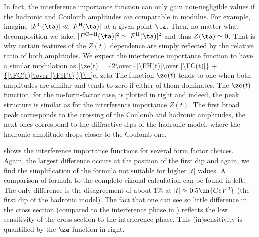 In fact, the interference importance function can only gain non-negligible values if the hadronic and Coulomb amplitudes are comparable in modulus. For example, imagine $|\FC(\ta)| \ll |\FH(\ta)|$ at a given point $\ta$. Then, no matter what decomposition  we take, $|\FCH(\ta)|^2 \simeq |\FH(\ta)|^2$ and thus $Z(\ta) \simeq 0$. That is why certain features of the $Z(t)$ dependence are simply reflected by the relative ratio of both amplitudes. We expect the interference importance function to have a similar modulation as 
\eqref{\ze(t) = {2\over {|\FH(t)|\over |\FC(t)|} + {|\FC(t)|\over |\FH(t)|}}\ .}{el zeta}
The function $\ze(t)$ tends to one when both amplitudes are similar and tends to zero if either of them dominates. The $\ze(t)$ function, for the no-form-factor case, is plotted in  right and indeed, the peak structure is similar as for the interference importance $Z(t)$. The first broad peak corresponds to the crossing of the Coulomb and hadronic amplitudes, the next ones correspond to the diffractive dips of the hadronic model, where the hadronic amplitude drops closer to the Coulomb one.

 shows the interference importance functions for several form factor choices. Again, the largest difference occurs at the position of the first dip and again, we find the simplification of the \WaY{} formula not suitable for higher $|t|$ values. A comparison of \KL{} formula to the complete eikonal calculation can be found in  left. The only difference is the disagreement of about $1\%$ at $|t| \approx 0.5\un{GeV^2}$ (the first dip of the hadronic model). The fact that one can see so little difference in the cross section (compared to the interference phase in ) reflects the low sensitivity of the cross section to the interference phase. This (in)sensitivity is quantified by the $\ze$ function in  right.






